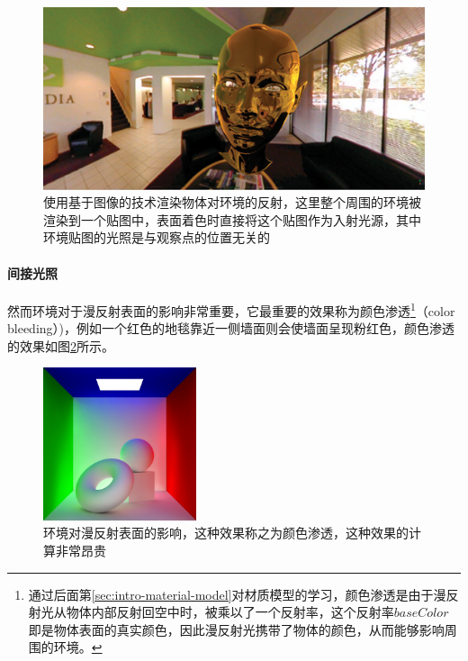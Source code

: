 \begin{figure}
\includegraphics[width=1.\textwidth]{figures/intro/reflection-1}	
\caption{使用基于图像的技术渲染物体对环境的反射，这里整个周围的环境被渲染到一个贴图中，表面着色时直接将这个贴图作为入射光源，其中环境贴图的光照是与观察点的位置无关的}
\label{f:intro-reflection-2}
\end{figure}




\paragraph{间接光照}
然而环境对于漫反射表面的影响非常重要，它最重要的效果称为颜色渗透\footnote{通过后面第\ref{sec:intro-material-model}对材质模型的学习，颜色渗透是由于漫反射光从物体内部反射回空中时，被乘以了一个反射率，这个反射率$baseColor$即是物体表面的真实颜色，因此漫反射光携带了物体的颜色，从而能够影响周围的环境。}（color bleeding）)，例如一个红色的地毯靠近一侧墙面则会使墙面呈现粉红色，颜色渗透的效果如图\ref{f:intro-indirect}所示。

\begin{figure}
\sidecaption
\includegraphics[width=0.4\textwidth]{figures/intro/indirect}	
\caption{环境对漫反射表面的影响，这种效果称之为颜色渗透，这种效果的计算非常昂贵}
\label{f:intro-indirect}
\end{figure}

